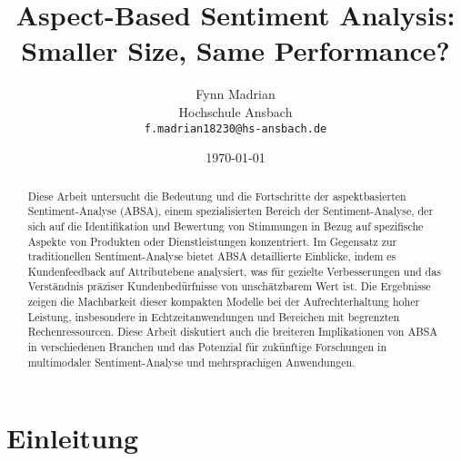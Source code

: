 \documentclass[12pt]{article}
\title{Aspect-Based Sentiment Analysis: Smaller Size, Same Performance?}
\author{Fynn Madrian \\ Hochschule Ansbach \\ \texttt{f.madrian18230@hs-ansbach.de}}
\date{\today}
\begin{document}
\maketitle

\begin{abstract}
Diese Arbeit untersucht die Bedeutung und die Fortschritte der aspektbasierten Sentiment-Analyse (ABSA), einem spezialisierten Bereich der 
Sentiment-Analyse, der sich auf die Identifikation und Bewertung von Stimmungen in Bezug auf spezifische Aspekte von Produkten oder Dienstleistungen 
konzentriert. Im Gegensatz zur traditionellen Sentiment-Analyse bietet ABSA detaillierte Einblicke, indem es Kundenfeedback auf Attributebene 
analysiert, was für gezielte Verbesserungen und das Verständnis präziser Kundenbedürfnisse von unschätzbarem Wert ist. 
Die Ergebnisse zeigen die Machbarkeit dieser kompakten Modelle bei der Aufrechterhaltung hoher Leistung, insbesondere 
in Echtzeitanwendungen und Bereichen mit begrenzten Rechenressourcen. Diese Arbeit diskutiert auch die breiteren Implikationen 
von ABSA in verschiedenen Branchen und das Potenzial für zukünftige Forschungen in multimodaler Sentiment-Analyse und mehrsprachigen 
Anwendungen.
\end{abstract}

\newpage

\tableofcontents

\newpage 

\section{Einleitung}
\end{document}
